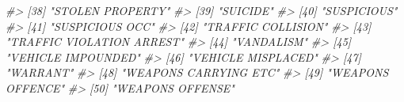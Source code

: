\documentclass[
  12pt,
]{book}
\newenvironment{Shaded}{\begin{snugshade}}{\end{snugshade}}
\newcommand{\CommentTok}[1]{\textcolor[rgb]{0.56,0.35,0.01}{\textit{#1}}}
\begin{document}
\begin{Shaded}
\begin{Highlighting}[]
\CommentTok{\#> [38] "STOLEN PROPERTY"                           }
\CommentTok{\#> [39] "SUICIDE"                                   }
\CommentTok{\#> [40] "SUSPICIOUS"                                }
\CommentTok{\#> [41] "SUSPICIOUS OCC"                            }
\CommentTok{\#> [42] "TRAFFIC COLLISION"                         }
\CommentTok{\#> [43] "TRAFFIC VIOLATION ARREST"                  }
\CommentTok{\#> [44] "VANDALISM"                                 }
\CommentTok{\#> [45] "VEHICLE IMPOUNDED"                         }
\CommentTok{\#> [46] "VEHICLE MISPLACED"                         }
\CommentTok{\#> [47] "WARRANT"                                   }
\CommentTok{\#> [48] "WEAPONS CARRYING ETC"                      }
\CommentTok{\#> [49] "WEAPONS OFFENCE"                           }
\CommentTok{\#> [50] "WEAPONS OFFENSE"}
\end{Highlighting}
\end{Shaded}
\end{document}
